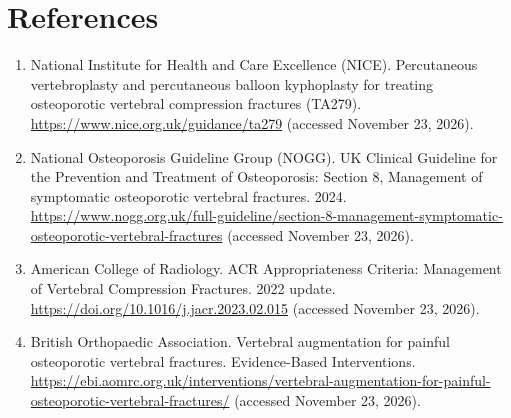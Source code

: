 \section*{References}
\begin{enumerate}
  \item National Institute for Health and Care Excellence (NICE). Percutaneous vertebroplasty and percutaneous balloon kyphoplasty for treating osteoporotic vertebral compression fractures (TA279). \url{https://www.nice.org.uk/guidance/ta279} (accessed November 23, 2026).
  \item National Osteoporosis Guideline Group (NOGG). UK Clinical Guideline for the Prevention and Treatment of Osteoporosis: Section 8, Management of symptomatic osteoporotic vertebral fractures. 2024. \url{https://www.nogg.org.uk/full-guideline/section-8-management-symptomatic-osteoporotic-vertebral-fractures} (accessed November 23, 2026).
  \item American College of Radiology. ACR Appropriateness Criteria: Management of Vertebral Compression Fractures. 2022 update. \url{https://doi.org/10.1016/j.jacr.2023.02.015} (accessed November 23, 2026).
  \item British Orthopaedic Association. Vertebral augmentation for painful osteoporotic vertebral fractures. Evidence-Based Interventions. \url{https://ebi.aomrc.org.uk/interventions/vertebral-augmentation-for-painful-osteoporotic-vertebral-fractures/} (accessed November 23, 2026).
\end{enumerate}

\clearpage
